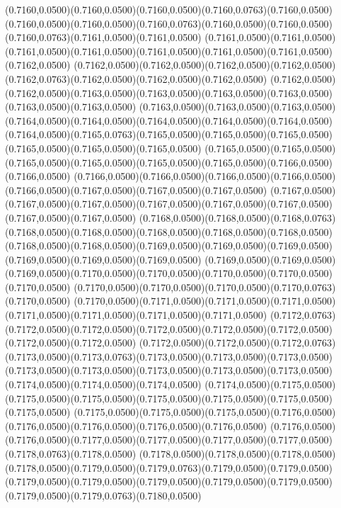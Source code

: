 (0.7160,0.0500)(0.7160,0.0500)(0.7160,0.0500)(0.7160,0.0763)(0.7160,0.0500)
\PST@Solid(0.7160,0.0500)(0.7160,0.0500)(0.7160,0.0763)(0.7160,0.0500)(0.7160,0.0500)(0.7160,0.0763)(0.7161,0.0500)(0.7161,0.0500)
(0.7161,0.0500)(0.7161,0.0500)(0.7161,0.0500)(0.7161,0.0500)(0.7161,0.0500)(0.7161,0.0500)(0.7161,0.0500)(0.7162,0.0500)
(0.7162,0.0500)(0.7162,0.0500)(0.7162,0.0500)(0.7162,0.0500)(0.7162,0.0763)(0.7162,0.0500)(0.7162,0.0500)(0.7162,0.0500)
(0.7162,0.0500)(0.7162,0.0500)(0.7163,0.0500)(0.7163,0.0500)(0.7163,0.0500)(0.7163,0.0500)(0.7163,0.0500)(0.7163,0.0500)
(0.7163,0.0500)(0.7163,0.0500)(0.7163,0.0500)(0.7164,0.0500)(0.7164,0.0500)(0.7164,0.0500)(0.7164,0.0500)(0.7164,0.0500)
(0.7164,0.0500)(0.7165,0.0763)(0.7165,0.0500)(0.7165,0.0500)(0.7165,0.0500)(0.7165,0.0500)(0.7165,0.0500)(0.7165,0.0500)
(0.7165,0.0500)(0.7165,0.0500)(0.7165,0.0500)(0.7165,0.0500)(0.7165,0.0500)(0.7165,0.0500)(0.7166,0.0500)(0.7166,0.0500)
(0.7166,0.0500)(0.7166,0.0500)(0.7166,0.0500)(0.7166,0.0500)(0.7166,0.0500)(0.7167,0.0500)(0.7167,0.0500)(0.7167,0.0500)
(0.7167,0.0500)(0.7167,0.0500)(0.7167,0.0500)(0.7167,0.0500)(0.7167,0.0500)(0.7167,0.0500)(0.7167,0.0500)(0.7167,0.0500)
(0.7168,0.0500)(0.7168,0.0500)(0.7168,0.0763)(0.7168,0.0500)(0.7168,0.0500)(0.7168,0.0500)(0.7168,0.0500)(0.7168,0.0500)
(0.7168,0.0500)(0.7168,0.0500)(0.7169,0.0500)(0.7169,0.0500)(0.7169,0.0500)(0.7169,0.0500)(0.7169,0.0500)(0.7169,0.0500)
(0.7169,0.0500)(0.7169,0.0500)(0.7169,0.0500)(0.7170,0.0500)(0.7170,0.0500)(0.7170,0.0500)(0.7170,0.0500)(0.7170,0.0500)
(0.7170,0.0500)(0.7170,0.0500)(0.7170,0.0500)(0.7170,0.0763)(0.7170,0.0500)
\PST@Solid(0.7170,0.0500)(0.7171,0.0500)(0.7171,0.0500)(0.7171,0.0500)(0.7171,0.0500)(0.7171,0.0500)(0.7171,0.0500)(0.7171,0.0500)
(0.7172,0.0763)(0.7172,0.0500)(0.7172,0.0500)(0.7172,0.0500)(0.7172,0.0500)(0.7172,0.0500)(0.7172,0.0500)(0.7172,0.0500)
(0.7172,0.0500)(0.7172,0.0500)(0.7172,0.0763)(0.7173,0.0500)(0.7173,0.0763)(0.7173,0.0500)(0.7173,0.0500)(0.7173,0.0500)
(0.7173,0.0500)(0.7173,0.0500)(0.7173,0.0500)(0.7173,0.0500)(0.7173,0.0500)(0.7174,0.0500)(0.7174,0.0500)(0.7174,0.0500)
(0.7174,0.0500)(0.7175,0.0500)(0.7175,0.0500)(0.7175,0.0500)(0.7175,0.0500)(0.7175,0.0500)(0.7175,0.0500)(0.7175,0.0500)
(0.7175,0.0500)(0.7175,0.0500)(0.7175,0.0500)(0.7176,0.0500)(0.7176,0.0500)(0.7176,0.0500)(0.7176,0.0500)(0.7176,0.0500)
(0.7176,0.0500)(0.7176,0.0500)(0.7177,0.0500)(0.7177,0.0500)(0.7177,0.0500)(0.7177,0.0500)(0.7178,0.0763)(0.7178,0.0500)
(0.7178,0.0500)(0.7178,0.0500)(0.7178,0.0500)(0.7178,0.0500)(0.7179,0.0500)(0.7179,0.0763)(0.7179,0.0500)(0.7179,0.0500)
(0.7179,0.0500)(0.7179,0.0500)(0.7179,0.0500)(0.7179,0.0500)(0.7179,0.0500)(0.7179,0.0500)(0.7179,0.0763)(0.7180,0.0500)
